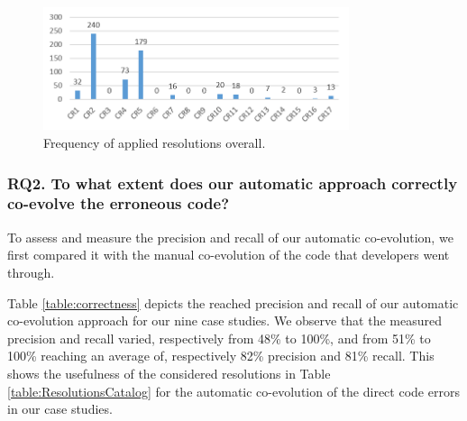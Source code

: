 	
	
	\begin{figure}
		\centering
	\includegraphics[width=0.8\textwidth]{./pics/chapter1pics/FrequencyICSE.png}
	\caption{Frequency of applied resolutions overall.}
	\label{fig:frequency_resolutions}
	\end{figure}
	
	
	\subsubsection{RQ2. To what extent does our automatic approach correctly co-evolve the erroneous code?} 
	
	To assess and measure the precision and recall of our automatic co-evolution, we first compared it with the manual co-evolution of the code that developers went through. 
	
	Table \ref{table:correctness} depicts the reached precision and recall of our automatic co-evolution approach for our nine case studies. We observe that the measured precision and recall varied, respectively from 48\% to 100\%, and from 51\% to 100\% reaching an average of, respectively 82\% precision and 81\% recall. 
	This shows the usefulness of the considered resolutions in Table \ref{table:ResolutionsCatalog} for the automatic co-evolution of the direct code errors in our case studies. %
	
